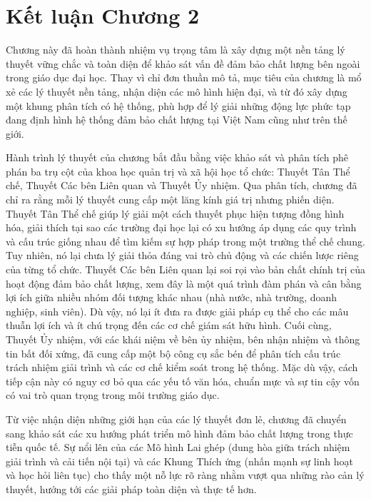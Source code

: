 \documentclass[12pt, a4paper, openany]{report}
\begin{document}
\section*{Kết luận Chương 2}
\label{sec:ket_luan_chuong_2_final}

Chương này đã hoàn thành nhiệm vụ trọng tâm là xây dựng một nền tảng lý thuyết vững chắc và toàn diện để khảo sát vấn đề đảm bảo chất lượng bên ngoài trong giáo dục đại học. Thay vì chỉ đơn thuần mô tả, mục tiêu của chương là mổ xẻ các lý thuyết nền tảng, nhận diện các mô hình hiện đại, và từ đó xây dựng một khung phân tích có hệ thống, phù hợp để lý giải những động lực phức tạp đang định hình hệ thống đảm bảo chất lượng tại Việt Nam cũng như trên thế giới.

Hành trình lý thuyết của chương bắt đầu bằng việc khảo sát và phân tích phê phán ba trụ cột của khoa học quản trị và xã hội học tổ chức: Thuyết Tân Thể chế, Thuyết Các bên Liên quan và Thuyết Ủy nhiệm. Qua phân tích, chương đã chỉ ra rằng mỗi lý thuyết cung cấp một lăng kính giá trị nhưng phiến diện. Thuyết Tân Thể chế giúp lý giải một cách thuyết phục hiện tượng đồng hình hóa, giải thích tại sao các trường đại học lại có xu hướng áp dụng các quy trình và cấu trúc giống nhau để tìm kiếm sự hợp pháp trong một trường thể chế chung. Tuy nhiên, nó lại chưa lý giải thỏa đáng vai trò chủ động và các chiến lược riêng của từng tổ chức. Thuyết Các bên Liên quan lại soi rọi vào bản chất chính trị của hoạt động đảm bảo chất lượng, xem đây là một quá trình đàm phán và cân bằng lợi ích giữa nhiều nhóm đối tượng khác nhau (nhà nước, nhà trường, doanh nghiệp, sinh viên). Dù vậy, nó lại ít đưa ra được giải pháp cụ thể cho các mâu thuẫn lợi ích và ít chú trọng đến các cơ chế giám sát hữu hình. Cuối cùng, Thuyết Ủy nhiệm, với các khái niệm về bên ủy nhiệm, bên nhận nhiệm và thông tin bất đối xứng, đã cung cấp một bộ công cụ sắc bén để phân tích cấu trúc trách nhiệm giải trình và các cơ chế kiểm soát trong hệ thống. Mặc dù vậy, cách tiếp cận này có nguy cơ bỏ qua các yếu tố văn hóa, chuẩn mực và sự tin cậy vốn có vai trò quan trọng trong môi trường giáo dục.

Từ việc nhận diện những giới hạn của các lý thuyết đơn lẻ, chương đã chuyển sang khảo sát các xu hướng phát triển mô hình đảm bảo chất lượng trong thực tiễn quốc tế. Sự nổi lên của các Mô hình Lai ghép (dung hòa giữa trách nhiệm giải trình và cải tiến nội tại) và các Khung Thích ứng (nhấn mạnh sự linh hoạt và học hỏi liên tục) cho thấy một nỗ lực rõ ràng nhằm vượt qua những rào cản lý thuyết, hướng tới các giải pháp toàn diện và thực tế hơn.
\end{document}
